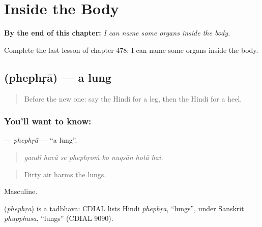 
\chapter{Inside the Body}
\label{ch:hi-inside-the-body}

\begin{chapteropening}
\textbf{By the end of this chapter:} \emph{I can name some organs inside the body.}

Complete the last lesson of chapter 478: I can name some organs inside the body.
\end{chapteropening}

\section[\texorpdfstring{\hi{फेफड़ा} (phephṛā)}{फेफड़ा (phephṛā)}]{ (phephṛā) — a lung}

\label{lesson:HI-C478-phephra}



\begin{quote}
Before the new one: say the Hindi for a leg, then the Hindi for a heel.
\end{quote}

\subsection*{You'll want to know: }
\textbf{} — \emph{phephṛā} — \textquotedblleft{}a lung\textquotedblright{}.

\begin{quote}
       
\end{quote}

\begin{quote}
\emph{gandī havā se phephṛoṁ ko nuqsān hotā hai.}
\end{quote}

\begin{quote}
Dirty air harms the lungs.
\end{quote}

Masculine.

\begin{cousinweb}
\textbf{} (\emph{phephṛā}) is a tadbhava: CDIAL lists Hindi \emph{phephṛā}, \textquotedblleft{}lungs\textquotedblright{}, under Sanskrit \emph{phupphusa}, \textquotedblleft{}lungs\textquotedblright{} (CDIAL 9090).
\end{cousinweb}

